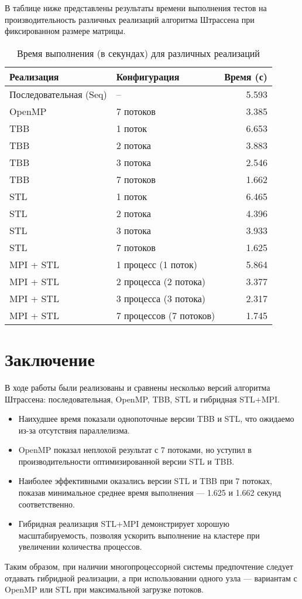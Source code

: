 \documentclass[14pt,a4paper]{extarticle}
\begin{document}
В таблице ниже представлены результаты времени выполнения тестов на производительность различных реализаций алгоритма Штрассена при фиксированном размере матрицы.

\begin{table}[H]
\centering
\caption{Время выполнения (в секундах) для различных реализаций}
\begin{tabular}{llr}
\toprule
\textbf{Реализация} & \textbf{Конфигурация} & \textbf{Время (с)} \\
\midrule
Последовательная (Seq)     & –                  & 5.593 \\
OpenMP                     & 7 потоков          & 3.385 \\
TBB                        & 1 поток            & 6.653 \\
TBB                        & 2 потока           & 3.883 \\
TBB                        & 3 потока           & 2.546 \\
TBB                        & 7 потоков          & 1.662 \\
STL                        & 1 поток            & 6.465 \\
STL                        & 2 потока           & 4.396 \\
STL                        & 3 потока           & 3.933 \\
STL                        & 7 потоков          & 1.625 \\
MPI + STL                  & 1 процесс (1 поток) & 5.864 \\
MPI + STL                  & 2 процесса (2 потока) & 3.377 \\
MPI + STL                  & 3 процесса (3 потока) & 2.317 \\
MPI + STL                  & 7 процессов (7 потоков) & 1.745 \\
\bottomrule
\end{tabular}
\end{table}

\section{Заключение}

В ходе работы были реализованы и сравнены несколько версий алгоритма Штрассена: последовательная, OpenMP, TBB, STL и гибридная STL+MPI.

\begin{itemize}
    \item Наихудшее время показали однопоточные версии TBB и STL, что ожидаемо из-за отсутствия параллелизма.
    \item OpenMP показал неплохой результат с 7 потоками, но уступил в производительности оптимизированной версии STL и TBB.
    \item Наиболее эффективными оказались версии STL и TBB при 7 потоках, показав минимальное среднее время выполнения — 1.625 и 1.662 секунд соответственно.
    \item Гибридная реализация STL+MPI демонстрирует хорошую масштабируемость, позволяя ускорить выполнение на кластере при увеличении количества процессов.
\end{itemize}

Таким образом, при наличии многопроцессорной системы предпочтение следует отдавать гибридной реализации, а при использовании одного узла — вариантам с OpenMP или STL при максимальной загрузке потоков.
\end{document}
